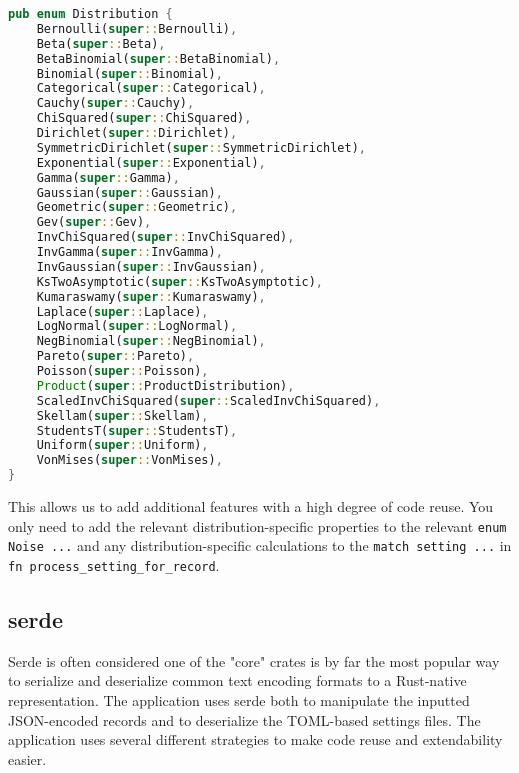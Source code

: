 \begin{lstlisting}[language=Rust, caption={Enum from rv::dist::distribution}, label={rv-enum}]
pub enum Distribution {
    Bernoulli(super::Bernoulli),
    Beta(super::Beta),
    BetaBinomial(super::BetaBinomial),
    Binomial(super::Binomial),
    Categorical(super::Categorical),
    Cauchy(super::Cauchy),
    ChiSquared(super::ChiSquared),
    Dirichlet(super::Dirichlet),
    SymmetricDirichlet(super::SymmetricDirichlet),
    Exponential(super::Exponential),
    Gamma(super::Gamma),
    Gaussian(super::Gaussian),
    Geometric(super::Geometric),
    Gev(super::Gev),
    InvChiSquared(super::InvChiSquared),
    InvGamma(super::InvGamma),
    InvGaussian(super::InvGaussian),
    KsTwoAsymptotic(super::KsTwoAsymptotic),
    Kumaraswamy(super::Kumaraswamy),
    Laplace(super::Laplace),
    LogNormal(super::LogNormal),
    NegBinomial(super::NegBinomial),
    Pareto(super::Pareto),
    Poisson(super::Poisson),
    Product(super::ProductDistribution),
    ScaledInvChiSquared(super::ScaledInvChiSquared),
    Skellam(super::Skellam),
    StudentsT(super::StudentsT),
    Uniform(super::Uniform),
    VonMises(super::VonMises),
}
\end{lstlisting}

This allows us to add additional features with a high degree of code reuse. You only need to add the relevant distribution-specific properties to the relevant \texttt{enum Noise {...}} and any distribution-specific calculations to the \texttt{match setting {...}} in \texttt{fn process\_setting\_for\_record}. 

\subsection{serde}
Serde is often considered one of the "core" crates is by far the most popular way to serialize and deserialize common text encoding formats to a Rust-native representation. The application uses serde both to manipulate the inputted JSON-encoded records and to deserialize the TOML-based settings files. The application uses several different strategies to make code reuse and extendability easier.


